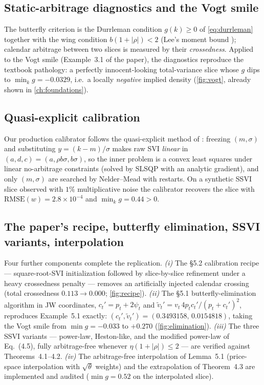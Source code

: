 \subsection{Static-arbitrage diagnostics and the Vogt smile}
The butterfly criterion is the Durrleman condition $g(k)\ge0$ of
\cref{eq:durrleman} together with the wing condition $b(1+|\rho|)<2$
(Lee's moment bound \cite{lee2004moment}); calendar arbitrage between two
slices is measured by their \emph{crossedness}. Applied to the Vogt smile
(Example~3.1 of the paper), the diagnostics reproduce the textbook pathology:
a perfectly innocent-looking total-variance slice whose $g$ dips to
$\min_k g=-0.0329$, i.e.\ a locally \emph{negative} implied density
(\cref{fig:vogt}, already shown in \cref{ch:foundations}).

\subsection{Quasi-explicit calibration}
Our production calibrator follows the quasi-explicit method of
\cite{zeliade2009quasi}: freezing $(m,\sigma)$ and substituting
$y=(k-m)/\sigma$ makes raw SVI \emph{linear} in $(a,d,c)=(a,\rho b\sigma,
b\sigma)$, so the inner problem is a convex least squares under linear
no-arbitrage constraints (solved by SLSQP with an analytic gradient), and only
$(m,\sigma)$ are searched by Nelder--Mead with restarts. On a synthetic SSVI
slice observed with $1\%$ multiplicative noise the calibrator recovers the
slice with $\mathrm{RMSE}(w)=2.8\times10^{-4}$ and $\min_k g=0.44>0$.

\subsection{The paper's recipe, butterfly elimination, SSVI variants,
interpolation}
Four further components complete the replication.
\emph{(i)} The \S5.2 calibration recipe --- square-root-SVI initialization
followed by slice-by-slice refinement under a heavy crossedness penalty ---
removes an artificially injected calendar crossing (total crossedness
$0.113\to0.000$; \cref{fig:recipe}).
\emph{(ii)} The \S5.1 butterfly-elimination algorithm in JW coordinates,
$c_t'=p_t+2\psi_t$ and $\tilde v_t'=v_t\,4p_tc_t'/(p_t+c_t')^2$, reproduces
Example~5.1 exactly: $(c_t',\tilde v_t')=(0.3493158,\,0.0154818)$, taking the
Vogt smile from $\min g=-0.033$ to $+0.270$ (\cref{fig:elimination}).
\emph{(iii)} The three SSVI variants --- power-law, Heston-like, and the
modified power-law of Eq.~(4.5), fully arbitrage-free whenever
$\eta(1+|\rho|)\le2$ --- are verified against Theorems~4.1--4.2.
\emph{(iv)} The arbitrage-free interpolation of Lemma~5.1 (price-space
interpolation with $\sqrt\theta$ weights) and the extrapolation of
Theorem~4.3 are implemented and audited ($\min g = 0.52$ on the interpolated
slice).

